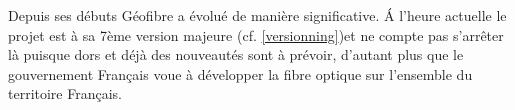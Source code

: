 Depuis ses débuts Géofibre a évolué de manière significative. \'A l'heure actuelle le projet est à sa 7ème version majeure (cf. \ref{versionning})et ne compte pas s'arrêter là puisque dors et déjà des nouveautés sont à prévoir, d'autant plus que le gouvernement Français voue à développer la fibre optique sur l'ensemble du territoire Français.
